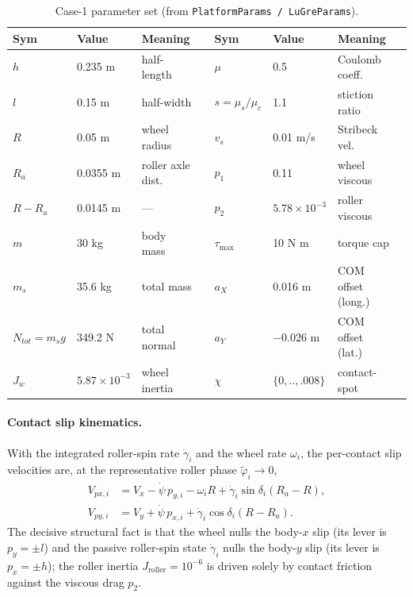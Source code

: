 \documentclass[11pt]{article}
\begin{document}
\begin{table}[h]\centering\small
\begin{tabular}{llll@{\hskip 2em}llll}
\toprule
Sym & Value & Meaning & & Sym & Value & Meaning\\
\midrule
$h$ & 0.235 m & half-length & & $\mu$ & 0.5 & Coulomb coeff.\\
$l$ & 0.15 m & half-width & & $s=\mu_s/\mu_c$ & 1.1 & stiction ratio\\
$R$ & 0.05 m & wheel radius & & $v_s$ & 0.01 m/s & Stribeck vel.\\
$R_a$ & 0.0355 m & roller axle dist. & & $p_1$ & 0.11 & wheel viscous\\
$R-R_a$ & 0.0145 m & --- & & $p_2$ & $5.78\!\times\!10^{-3}$ & roller viscous\\
$m$ & 30 kg & body mass & & $\tau_{\max}$ & 10 N m & torque cap\\
$m_s$ & 35.6 kg & total mass & & $a_X$ & 0.016 m & COM offset (long.)\\
$N_{tot}=m_s g$ & 349.2 N & total normal & & $a_Y$ & $-0.026$ m & COM offset (lat.)\\
$J_w$ & $5.87\!\times\!10^{-3}$ & wheel inertia & & $\chi$ & $\{0,..,.008\}$ & contact-spot\\
\bottomrule
\end{tabular}
\caption{Case-1 parameter set (from \texttt{PlatformParams / LuGreParams}).}
\label{tab:params}
\end{table}

\paragraph{Contact slip kinematics.} With the integrated roller-spin rate $\dot\gamma_i$ and
the wheel rate $\omega_i$, the per-contact slip velocities are, at the representative roller
phase $\tilde\varphi_i\to0$,
\begin{align}
V_{px,i}&=V_x-\dot\psi\,p_{y,i}-\omega_i R+\dot\gamma_i\sin\delta_i(R_a-R),\\
V_{py,i}&=V_y+\dot\psi\,p_{x,i}+\dot\gamma_i\cos\delta_i(R-R_a).
\end{align}
The decisive structural fact is that the wheel nulls the body-$x$ slip (its lever is
$p_y=\pm l$) and the passive roller-spin state $\dot\gamma_i$ nulls the body-$y$ slip (its lever
is $p_x=\pm h$); the roller inertia $J_{\text{roller}}=10^{-6}$ is driven solely by contact
friction against the viscous drag $p_2$.
\end{document}
